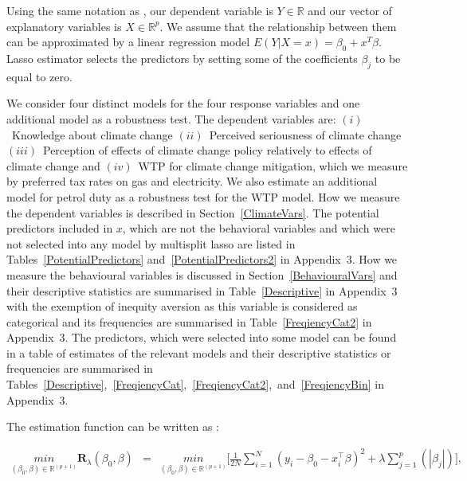 \documentclass[a4paper,12pt]{article}
\begin{document}
Using the same notation as \citet{Friedman2010}, our dependent variable is $Y \in \mathbb{R}$ and our vector of explanatory variables is $X \in \mathbb{R}^p$. We assume that the relationship between them can be approximated by a linear regression model $E(Y|X=x) = \beta_0+x^T\beta$. Lasso estimator selects the predictors by setting some of the coefficients $\beta_j$ to be equal to zero.


We consider four distinct models for the four response variables and one additional model as a robustness test. The dependent variables are: $(i)$~Knowledge about climate change $(ii)$~Perceived seriousness of climate change $(iii)$~Perception of effects of climate change policy relatively to effects of climate change and $(iv)$~WTP for climate change mitigation, which we measure by preferred tax rates on gas and electricity. We also estimate an additional model for petrol duty as a robustness test for the WTP model. How we measure the dependent variables is described in Section~\ref{ClimateVars}. The potential predictors included in $x$, which are not the behavioral variables and which were not selected into any model by multisplit lasso are listed in Tables~\ref{PotentialPredictors} and~\ref{PotentialPredictors2} in Appendix~$3$. How we measure the behavioural variables is discussed in Section~\ref{BehaviouralVars} and their descriptive statistics are summarised in Table~\ref{Descriptive} in Appendix~$3$ with the exemption of inequity aversion as this variable is considered as categorical and its frequencies are summarised in Table~\ref{FreqiencyCat2} in Appendix~$3$. The predictors, which were selected into some model can be found in a table of estimates of the relevant models and their descriptive statistics or frequencies are summarised in Tables~\ref{Descriptive},~\ref{FreqiencyCat},~\ref{FreqiencyCat2},~and~\ref{FreqiencyBin} in Appendix~$3$.

\sloppy
The estimation function can be written as \citep{Friedman2010}:


\begin{equation}\label{Lasso}
\begin{array}{lcll}

 \underset{(\beta_0, \beta) \in \mathbb{R}^{(p+1)}}{min} \boldsymbol{R}_{\lambda}(\beta_0, \beta)&=&
   \underset{(\beta_0, \beta) \in \mathbb{R}^{(p+1)}}{min} \bigg[ \frac{1}{2N}\sum_{i=1}^{N}(y_i - \beta_0-x_i^{\intercal}\beta)^2 + \lambda\sum_{j=1}^{p}(|\beta_j|) \bigg], \\
\end{array}
\end{equation}
\end{document}
